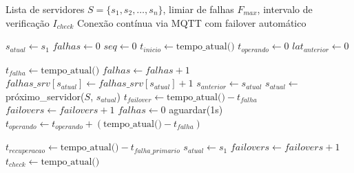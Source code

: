 %


\begin{algorithm}[H]
\caption{Failover Multi-Cloud com M\'{e}tricas de Confiabilidade}
\label{alg:failover}
\begin{algorithmic}[1]
\REQUIRE Lista de servidores $S = \{s_1, s_2, \ldots, s_n\}$, limiar de falhas $F_{max}$, intervalo de verifica\c{c}\~{a}o $I_{check}$
\ENSURE Conex\~{a}o cont\'{i}nua via MQTT com failover autom\'{a}tico

\STATE $s_{atual} \leftarrow s_1$ 
\STATE $falhas \leftarrow 0$
\STATE $seq \leftarrow 0$
\STATE $t_{inicio} \leftarrow \text{tempo\_atual()}$
\STATE $t_{operando} \leftarrow 0$
\STATE $lat_{anterior} \leftarrow 0$

        \STATE $t_{falha} \leftarrow \text{tempo\_atual()}$
            \STATE $falhas \leftarrow falhas + 1$
            \STATE $falhas\_srv[s_{atual}] \leftarrow falhas\_srv[s_{atual}] + 1$
                \STATE $s_{anterior} \leftarrow s_{atual}$
                \STATE $s_{atual} \leftarrow$ pr\'{o}ximo\_servidor($S$, $s_{atual}$)
                \STATE $t_{failover} \leftarrow \text{tempo\_atual()} - t_{falha}$
                \STATE $failovers \leftarrow failovers + 1$
                \STATE $falhas \leftarrow 0$
            \ENDIF
            \STATE aguardar(1s)
        \ENDWHILE
        \STATE $t_{operando} \leftarrow t_{operando} + (\text{tempo\_atual()} - t_{falha})$
    \ENDIF

            \STATE $t_{recuperacao} \leftarrow \text{tempo\_atual()} - t_{falha\_primario}$
            \STATE $s_{atual} \leftarrow s_1$
            \STATE $failovers \leftarrow failovers + 1$
        \ENDIF
        \STATE $t_{check} \leftarrow \text{tempo\_atual()}$
    \ENDIF


\end{algorithmic}
\end{algorithm}
